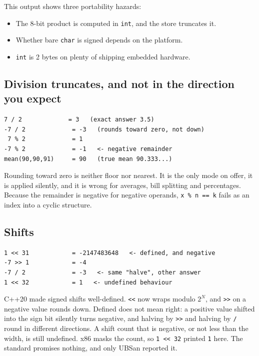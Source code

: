 \documentclass[11pt,a4paper]{article}
\newcommand{\code}[1]{\texttt{\small #1}}
\begin{document}
\noindent
This output shows three portability hazards:
\begin{itemize}
\item The 8-bit product is computed in \code{int}, and the store truncates it.
\item Whether bare \code{char} is signed depends on the platform.
\item \code{int} is 2 bytes on plenty of shipping embedded hardware.
\end{itemize}

\subsection{Division truncates, and not in the direction you expect}


\begin{lstlisting}[style=term]
 7 / 2             = 3   (exact answer 3.5)
-7 / 2             = -3   (rounds toward zero, not down)
 7 % 2             = 1
-7 % 2             = -1   <- negative remainder
mean(90,90,91)     = 90   (true mean 90.333...)
\end{lstlisting}

\noindent
Rounding toward zero is neither floor nor nearest. It is the only mode on
offer, it is applied silently, and it is wrong for averages, bill splitting and
percentages. Because the remainder is negative for negative operands,
\code{x \% n == k} fails as an index into a cyclic structure.

\subsection{Shifts}


\begin{lstlisting}[style=term]
1 << 31            = -2147483648   <- defined, and negative
-7 >> 1            = -4
-7 / 2             = -3   <- same "halve", other answer
1 << 32            = 1   <- undefined behaviour
\end{lstlisting}

\noindent
C++20 made signed shifts well-defined. \code{<<} now wraps modulo $2^N$, and
\code{>>} on a negative value rounds down. Defined does not mean right: a
positive value shifted into the sign bit silently turns negative, and halving
by \code{>>} and halving by \code{/} round in different directions. A shift
count that is negative, or not less than the width, is still undefined. x86
masks the count, so \code{1 << 32} printed \code{1} here. The standard
promises nothing, and only UBSan reported it.
\end{document}

